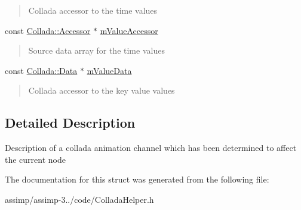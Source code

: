 \begin{DoxyCompactItemize}
\begin{DoxyCompactList}\small\item\em \begin{quote}
Collada accessor to the time values \end{quote}
\end{DoxyCompactList}\item 
\hypertarget{struct_assimp_1_1_collada_1_1_channel_entry_a9cbc626cceccda1767a1223d6c06fa8f}{const \hyperlink{struct_assimp_1_1_collada_1_1_accessor}{Collada\+::\+Accessor} $\ast$ \hyperlink{struct_assimp_1_1_collada_1_1_channel_entry_a9cbc626cceccda1767a1223d6c06fa8f}{m\+Value\+Accessor}}\label{struct_assimp_1_1_collada_1_1_channel_entry_a9cbc626cceccda1767a1223d6c06fa8f}

\begin{DoxyCompactList}\small\item\em \begin{quote}
Source data array for the time values \end{quote}
\end{DoxyCompactList}\item 
\hypertarget{struct_assimp_1_1_collada_1_1_channel_entry_abe2337d7536fc6666fd18f5316849ac8}{const \hyperlink{struct_assimp_1_1_collada_1_1_data}{Collada\+::\+Data} $\ast$ \hyperlink{struct_assimp_1_1_collada_1_1_channel_entry_abe2337d7536fc6666fd18f5316849ac8}{m\+Value\+Data}}\label{struct_assimp_1_1_collada_1_1_channel_entry_abe2337d7536fc6666fd18f5316849ac8}

\begin{DoxyCompactList}\small\item\em \begin{quote}
Collada accessor to the key value values \end{quote}
\end{DoxyCompactList}\end{DoxyCompactItemize}


\subsection{Detailed Description}
Description of a collada animation channel which has been determined to affect the current node 

The documentation for this struct was generated from the following file\+:\begin{DoxyCompactItemize}
\item 
assimp/assimp-\/3../code/Collada\+Helper.\+h\end{DoxyCompactItemize}
